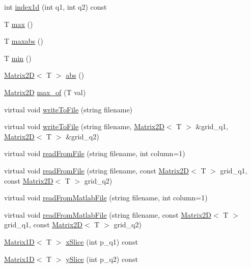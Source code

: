 \begin{DoxyCompactItemize}
int \hyperlink{class_matrix2_d_ae1902a53e5d60c928c0d4fafb3071e27}{index1d} (int q1, int q2) const 
\item 
T \hyperlink{class_matrix2_d_a5d017d890c1dbb9c8fcc809a05127a52}{max} ()
\item 
T \hyperlink{class_matrix2_d_a2de29bef08caa53b49c75e9b9544f06c}{maxabs} ()
\item 
T \hyperlink{class_matrix2_d_a6c5a6ca8264f7acd2617ec5d2a6a50cc}{min} ()
\item 
\hyperlink{class_matrix2_d}{Matrix2\+D}$<$ T $>$ \hyperlink{class_matrix2_d_a697110733f22983b1ae9e377a055fb18}{abs} ()
\item 
\hyperlink{class_matrix2_d}{Matrix2\+D} \hyperlink{class_matrix2_d_a67f9470b32ccf8e674772add591921b9}{max\+\_\+of} (T val)
\item 
virtual void \hyperlink{class_matrix2_d_aaf3da60d31c79b63367277a7088f0d6c}{write\+To\+File} (string filename)
\item 
virtual void \hyperlink{class_matrix2_d_abc7a357bed4cbb5a88e12f61b03daed3}{write\+To\+File} (string filename, \hyperlink{class_matrix2_d}{Matrix2\+D}$<$ T $>$ \&grid\+\_\+q1, \hyperlink{class_matrix2_d}{Matrix2\+D}$<$ T $>$ \&grid\+\_\+q2)
\item 
virtual void \hyperlink{class_matrix2_d_aeaea285c427a29615e23177df74b9d24}{read\+From\+File} (string filename, int column=1)
\item 
virtual void \hyperlink{class_matrix2_d_a6212224265ff7f64ecd9350cce46dbe5}{read\+From\+File} (string filename, const \hyperlink{class_matrix2_d}{Matrix2\+D}$<$ T $>$ grid\+\_\+q1, const \hyperlink{class_matrix2_d}{Matrix2\+D}$<$ T $>$ grid\+\_\+q2)
\item 
virtual void \hyperlink{class_matrix2_d_afa167f838658f70c0991b96053106292}{read\+From\+Matlab\+File} (string filename, int column=1)
\item 
virtual void \hyperlink{class_matrix2_d_a8c7a0fa973619449e77b20051a10425a}{read\+From\+Matlab\+File} (string filename, const \hyperlink{class_matrix2_d}{Matrix2\+D}$<$ T $>$ grid\+\_\+q1, const \hyperlink{class_matrix2_d}{Matrix2\+D}$<$ T $>$ grid\+\_\+q2)
\item 
\hyperlink{class_matrix1_d}{Matrix1\+D}$<$ T $>$ \hyperlink{class_matrix2_d_a238207d50bbbe972b75a832cdc94914e}{x\+Slice} (int p\+\_\+q1) const 
\item 
\hyperlink{class_matrix1_d}{Matrix1\+D}$<$ T $>$ \hyperlink{class_matrix2_d_aaab861f594bec1eb6436b1941f80a9e5}{y\+Slice} (int p\+\_\+q2) const 
\end{DoxyCompactItemize}
